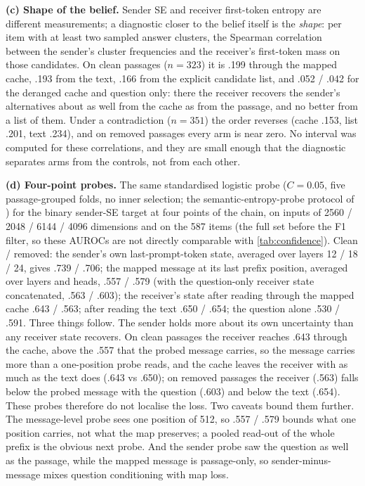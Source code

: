 \documentclass{article}
\begin{document}
\textbf{(c) Shape of the belief.} Sender SE and receiver first-token entropy are different measurements; a diagnostic closer to the belief itself is the \emph{shape}: per item with at least two sampled answer clusters, the Spearman correlation between the sender's cluster frequencies and the receiver's first-token mass on those candidates. On clean passages ($n = 323$) it is .199 through the mapped cache, .193 from the text, .166 from the explicit candidate list, and .052 / .042 for the deranged cache and question only: there the receiver recovers the sender's alternatives about as well from the cache as from the passage, and no better from a list of them. Under a contradiction ($n = 351$) the order reverses (cache .153, list .201, text .234), and on removed passages every arm is near zero. No interval was computed for these correlations, and they are small enough that the diagnostic separates arms from the controls, not from each other.

\textbf{(d) Four-point probes.} The same standardised logistic probe ($C = 0.05$, five passage-grouped folds, no inner selection; the semantic-entropy-probe protocol of \citealp{kossen2024sep}) for the binary sender-SE target at four points of the chain, on inputs of 2560 / 2048 / 6144 / 4096 dimensions and on the 587 items (the full set before the F1 filter, so these AUROCs are not directly comparable with \cref{tab:confidence}). Clean / removed: the sender's own last-prompt-token state, averaged over layers 12 / 18 / 24, gives .739 / .706; the mapped message at its last prefix position, averaged over layers and heads, .557 / .579 (with the question-only receiver state concatenated, .563 / .603); the receiver's state after reading through the mapped cache .643 / .563; after reading the text .650 / .654; the question alone .530 / .591. Three things follow. The sender holds more about its own uncertainty than any receiver state recovers. On clean passages the receiver reaches .643 through the cache, above the .557 that the probed message carries, so the message carries more than a one-position probe reads, and the cache leaves the receiver with as much as the text does (.643 vs .650); on removed passages the receiver (.563) falls below the probed message with the question (.603) and below the text (.654). These probes therefore do not localise the loss. Two caveats bound them further. The message-level probe sees one position of 512, so .557 / .579 bounds what one position carries, not what the map preserves; a pooled read-out of the whole prefix is the obvious next probe. And the sender probe saw the question as well as the passage, while the mapped message is passage-only, so sender-minus-message mixes question conditioning with map loss.
\end{document}
